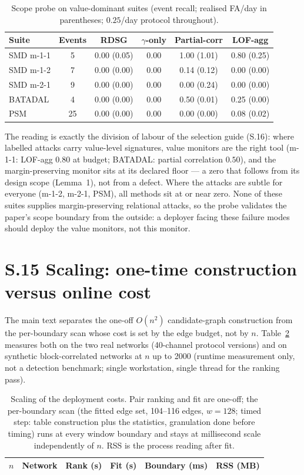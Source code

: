 \documentclass[11pt,a4paper]{article}
\begin{document}
\begin{table}[h]\centering\small
\caption{Scope probe on value-dominant suites (event recall; realised
FA/day in parentheses; $0.25$/day protocol throughout).}
\label{tab:s20}
\begin{tabular}{lccccc}
\hline
Suite & Events & RDSG & $\gamma$-only & Partial-corr & LOF-agg \\
\hline
SMD m-1-1 & 5 & 0.00 (0.05) & 0.00 & 1.00 (1.01) & 0.80 (0.25) \\
SMD m-1-2 & 7 & 0.00 (0.00) & 0.00 & 0.14 (0.12) & 0.00 (0.00) \\
SMD m-2-1 & 9 & 0.00 (0.00) & 0.00 & 0.00 (0.24) & 0.00 (0.00) \\
BATADAL & 4 & 0.00 (0.00) & 0.00 & 0.50 (0.01) & 0.25 (0.00) \\
PSM & 25 & 0.00 (0.00) & 0.00 & 0.00 (0.00) & 0.08 (0.02) \\
\hline
\end{tabular}
\end{table}

The reading is exactly the division of labour of the selection guide
(S.16): where labelled attacks carry value-level signatures, value
monitors are the right tool (m-1-1: LOF-agg $0.80$ at budget; BATADAL:
partial correlation $0.50$), and the margin-preserving monitor sits at
its declared floor --- a zero that follows from its design scope
(Lemma~1), not from a defect. Where the attacks are subtle for
everyone (m-1-2, m-2-1, PSM), all methods sit at or near zero. None of
these suites supplies margin-preserving relational attacks, so the
probe validates the paper's scope boundary from the outside: a
deployer facing these failure modes should deploy the value monitors,
not this monitor.

\section*{S.15 Scaling: one-time construction versus online cost}

The main text separates the one-off $O(n^2)$ candidate-graph
construction from the per-boundary scan whose cost is set by the edge
budget, not by $n$. Table~\ref{tab:s15} measures both on the two real
networks (40-channel protocol versions) and on synthetic block-correlated
networks at $n$ up to 2000 (runtime measurement only, not a detection
benchmark; single workstation, single thread for the ranking pass).

\begin{table}[h]\centering\small
\caption{Scaling of the deployment costs. Pair ranking and fit are
one-off; the per-boundary scan (the fitted edge set, 104--116 edges, $w{=}128$;
timed step: table construction plus the statistics, granulation done
before timing) runs at every window boundary and stays at millisecond
scale independently of $n$. RSS is the process reading after fit.}
\label{tab:s15}
\begin{tabular}{@{}rlcccc@{}}
\toprule
$n$ & Network & Rank (s) & Fit (s) & Boundary (ms) & RSS (MB) \\
\midrule

\end{tabular}
\end{table}
\end{document}
